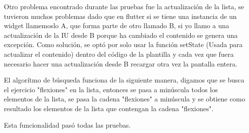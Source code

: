Otro problema encontrado durante las pruebas fue la actualización de la lista, se tuvieron muchos problemas dado que en flutter si se tiene una instancia de un widget llamemoslo A, que forma parte de otro llamado B, si yo llamo a una actualización de la IU desde B porque ha cambiado el contenido se genera una excepción. Como solución, se optó por solo usar la función setState (Usada para actualizar el contenido) dentro del código de la plantilla y cada vez que fuera necesario hacer una actualización desde B recargar otra vez la pantalla entera.

El algorítmo de búsqueda funciona de la siguiente manera, digamos que se busca el ejercicio "flexiones" en la lista, entonces se pasa a minúscula todos los elementos de la lista, se pasa la cadena "flexiones" a minúscula y se obtiene como resultado los elementos de la lista que contengan la cadena "flexiones".

Esta funcionalidad pasó todas las pruebas.


